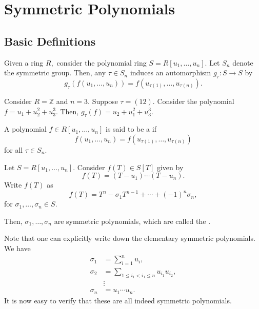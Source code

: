\chapter{Symmetric Polynomials}
\section{Basic Definitions}

\begin{defn}%
    Given a ring $R,$ consider the polynomial ring $S = R[u_1, \ldots, u_n].$ Let $S_n$ denote the symmetric group. Then, any $\tau \in S_n$ induces an automorphism $g_{\tau} : S \to S$ by
    \begin{equation*} 
        g_{\tau}(f(u_1, \ldots, u_n)) = f(u_{\tau(1)}, \ldots, u_{\tau(n)}).
    \end{equation*}
\end{defn}

\begin{ex}
    Consider $R = \mathbb{Z}$ and $n = 3.$ Suppose $\tau = (12).$ Consider the polynomial $f = u_1 + u_2^2 + u_3^3.$ Then, $g_{\tau}(f) = u_2 + u_1^2 + u_3^3.$
\end{ex}

\begin{defn}%
    A polynomial $f \in R[u_1, \ldots, u_n]$ is said to be a  if 
    \begin{equation*} 
        f(u_1, \ldots, u_n) = f(u_{\tau(1)}, \ldots, u_{\tau(n)})
    \end{equation*} 
    for all $\tau \in S_n.$
\end{defn}

\begin{defn}%
    Let $S = R[u_1, \ldots, u_n].$ Consider $f(T) \in S[T]$ given by
    \begin{equation*} 
        f(T) = (T - u_1) \cdots (T - u_n).
    \end{equation*}
    Write $f(T)$ as 
    \begin{equation*} 
        f(T) = T^n - \sigma_1 T^{n - 1} + \cdots + (-1)^n \sigma_n,
    \end{equation*}
    for $\sigma_1, \ldots, \sigma_n \in S.$

    Then, $\sigma_1, \ldots, \sigma_n$ are symmetric polynomials, which are called the .
\end{defn}

\begin{rem}
    Note that one can explicitly write down the elementary symmetric polynomials. We have
    \begin{align*} 
        \sigma_1 &= \sum_{i = 1}^{n} u_i,\\
        \sigma_2 &= \sum_{1 \le i_1 < i_1 \le n} u_{i_1}u_{i_2},\\
        & \vdots \\
        \sigma_n &= u_1 \cdots u_n.
    \end{align*}
    It is now easy to verify that these are all indeed symmetric polynomials.
\end{rem}

